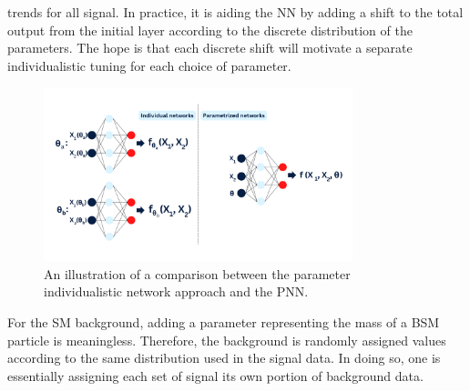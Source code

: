 trends for all signal. In practice, it is aiding the \ac{NN} by adding a shift to the total output from the initial layer according to 
the discrete distribution of the parameters. The hope is that each discrete shift will motivate a separate individualistic tuning
for each choice of parameter. 
\begin{figure}
    \centering
    \includegraphics[width=0.8\textwidth]{Figures/Illustrations/PNN.png}
    \vspace{-.8cm}
    \caption{An illustration of a comparison between the parameter individualistic network 
    approach and the \acs{PNN}.}
    \label{fig:PNN}
\end{figure}
For the \ac{SM} background, adding a parameter representing the mass of a \ac{BSM} particle is meaningless. 
Therefore, the background is randomly assigned values according to the same distribution used in the signal data. 
In doing so, one is essentially assigning each set of signal its own portion of background data. 